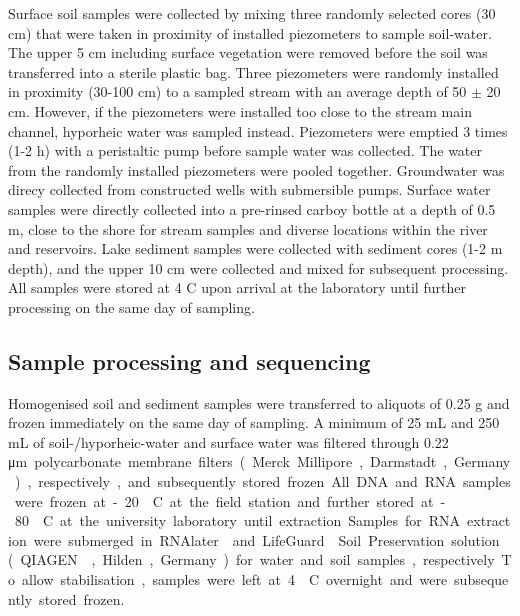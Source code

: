 \documentclass[12pt,a4paper]{article} %
\begin{document}
Surface soil samples were collected by mixing three randomly selected cores (30 cm) that were taken in proximity of installed piezometers to sample soil-water. The upper 5 cm including surface vegetation were removed before the soil was transferred into a sterile plastic bag. Three piezometers were randomly installed in proximity (30-100 cm) to a sampled stream with an average depth of 50 $\pm$ 20 cm. However, if the piezometers were installed too close to the stream main channel, hyporheic water was sampled instead. Piezometers were emptied 3 times (1-2 h) with a peristaltic pump before sample water was collected. The water from the randomly installed piezometers were pooled together. Groundwater was direcy collected from constructed wells with submersible pumps. Surface water samples were directly collected into a pre-rinsed carboy bottle at a depth of 0.5 m, close to the shore for stream samples and diverse locations within the river and reservoirs. Lake sediment samples were collected with sediment cores (1-2 m depth), and the upper 10 cm were collected and mixed for subsequent processing. All samples were stored at 4 \textdegree{}C upon arrival at the laboratory until further processing on the same day of sampling. 

\subsection*{Sample processing and sequencing}
Homogenised soil and sediment samples were transferred to aliquots of 0.25 g and frozen immediately on the same day of sampling. A minimum of 25 mL and 250 mL of soil-/hyporheic-water and surface water was filtered through 0.22 \si\micro m polycarbonate membrane filters (Merck Millipore, Darmstadt, Germany), respectively, and subsequently stored frozen. All DNA and RNA samples were frozen at -20 \textdegree{}C at the field station and further stored at -80 \textdegree{}C at the university laboratory until extraction. Samples for RNA extraction were submerged in RNAlater\textsuperscript{\textregistered} and LifeGuard\textsuperscript{\textregistered} Soil Preservation solution (QIAGEN\textsuperscript{\textregistered}, Hilden, Germany) for water and soil samples, respectively. To allow stabilisation, samples were left at 4 \textdegree{}C overnight and were subsequently stored frozen.
\end{document}
